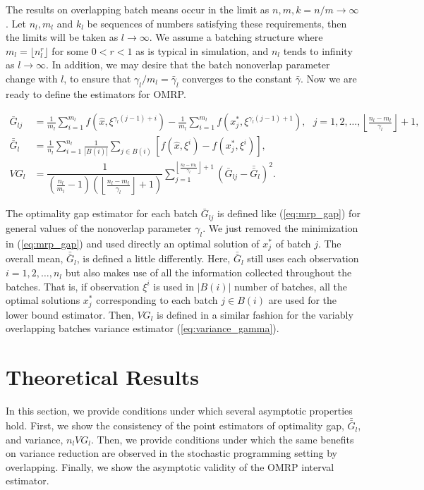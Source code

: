 \documentclass[12pt]{article}
\newcommand{\x}{x}
\newcommand{\xh}{{\hat{\x}}}
\newcommand{\xs}{\x^*}
\newcommand{\xit}{\xi}
\newcommand{\xiti}{\xit^i}
\newcommand{\nbl}{\left\lfloor\tfrac{n_l-m_l}{\gamma_l}\right\rfloor+1}
\newcommand{\gammab}{\bar{\gamma}}
\newcommand{\gb}{\bar{G}}
\newcommand{\gbb}{\bar{\gb}}
\begin{document}
The results on overlapping batch means occur in the limit as $n, m, k=n/m \rightarrow \infty$ \citep{damerdji1994strong,damerdji1995mean,Meketon1984,Song1992,Welch1987}.  
Let $n_l, m_l$ and $k_l$ be sequences of numbers satisfying these requirements, then the limits will be taken as $l \rightarrow \infty$.  
We assume a batching structure where $m_l = \lfloor n_l ^r \rfloor$ for some $0<r<1$ as is typical in simulation, and $n_l$ tends to infinity as $l \rightarrow \infty$.  
In addition, we may desire that the batch nonoverlap parameter change with $l$, to ensure that $\gamma_l / m_l = \gammab_l$ converges to the constant $\gammab$.  
Now we are ready to define the estimators for OMRP.

\begin{align}
	\gb_{lj} & = \frac{1}{m_l} \sum_{i=1}^{m_l} f(\xh,\xit^{\gamma_l(j-1)+i}) - \frac{1}{m_l} \sum_{i=1}^{m_l} f(\xs_j,\xit^{\gamma_l(j-1)+1}),\ \ \ j = 1, 2, \dots, \nbl, \label{eq:gbar} \\
	\gbb_l & = \frac{1}{n_l} \sum_{i=1}^{n_l} \frac{1}{|B(i)|} \sum_{j \in B(i)} \left[ f(\xh,\xiti) - f(\xs_j,\xiti) \right], \label{eq:gbb} \\
	VG_l & = \dfrac{1}{\left( \tfrac{n_l}{m_l} - 1 \right) \left(\nbl\right)} \sum_{j=1}^{\nbl} (\gb_{lj} - \gbb_l)^2. \label{eq:vg}
\end{align}

The optimality gap estimator for each batch $\gb_{lj}$ is defined like (\ref{eq:mrp_gap}) for general values of the nonoverlap parameter $\gamma_l$.  
We just removed the minimization in (\ref{eq:mrp_gap}) and used directly an optimal solution of $\xs_j$ of batch $j$.  
The overall mean, $\gbb_l$, is defined a little differently.  
Here, $\gbb_l$ still uses each observation $i = 1, 2, \dots, n_l$ but also makes use of all the information collected throughout the batches.  
That is, if observation $\xiti$ is used in $|B(i)|$ number of batches, all the optimal solutions $\xs_j$ corresponding to each batch $j \in B(i)$ are used for the lower bound estimator.  
Then, $VG_l$ is defined in a similar fashion for the variably overlapping batches variance estimator (\ref{eq:variance_gamma}).


\section{Theoretical Results} 
\label{sec:theory}

In this section, we provide conditions under which several asymptotic properties hold. 
First, we show the consistency of the point estimators of optimality gap, $\gbb_l$, and variance, $n_l VG_l$. 
Then, we provide conditions under which the same benefits on variance reduction are observed in the stochastic programming setting by overlapping. 
Finally, we show the asymptotic validity of the OMRP interval estimator. 
\end{document}
